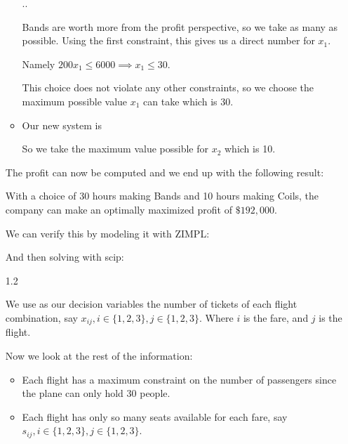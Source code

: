 \documentclass[12pt,letterpaper]{article}
\begin{document}
\begin{enumerate}
\begin{itemize}
          \sysdelim..

          Bands are worth more from the profit perspective, so we take as many as possible.
          Using the first constraint, this gives us a direct number for $x_1$.

          Namely $200 x_1 \leq 6000 \implies x_1 \leq 30$.

          This choice does not violate any other constraints,
          so we choose the maximum possible value $x_1$ can take which is 30.

        \item
          Our new system is


          So we take the maximum value possible for $x_2$ which is 10.
      \end{itemize}

      The profit can now be computed and we end up with the following result:

      With a choice of 30 hours making Bands and 10 hours making Coils,
      the company can make an optimally maximized profit of $\$192,000$.

      We can verify this by modeling it with ZIMPL:

      

      And then solving with scip:

      

    \item [1.2]

      We use as our decision variables the number of tickets of each flight combination,
      say $x_{ij}, i \in \{1, 2, 3\}, j \in \{1, 2, 3\}$.
      Where $i$ is the fare, and $j$ is the flight.

      Now we look at the rest of the information:

      \begin{itemize}
        \item
          Each flight has a maximum constraint on the number of passengers since the plane can only hold 30 people.

        \item
          Each flight has only so many seats available for each fare,
          say $s_{ij}, i \in \{1, 2, 3\}, j \in \{1, 2, 3\}$.


\end{itemize}
\end{enumerate}
\end{document}
